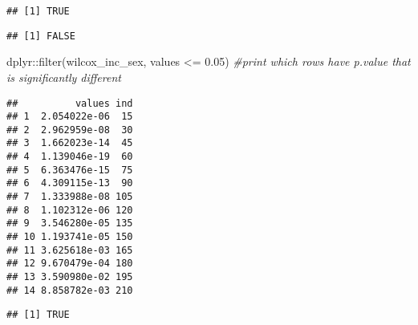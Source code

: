 \documentclass[
]{article}
\newenvironment{Shaded}{\begin{snugshade}}{\end{snugshade}}
\newcommand{\CommentTok}[1]{\textcolor[rgb]{0.56,0.35,0.01}{\textit{#1}}}
\newcommand{\FloatTok}[1]{\textcolor[rgb]{0.00,0.00,0.81}{#1}}
\newcommand{\FunctionTok}[1]{\textcolor[rgb]{0.00,0.00,0.00}{#1}}
\newcommand{\NormalTok}[1]{#1}
\newcommand{\OtherTok}[1]{\textcolor[rgb]{0.56,0.35,0.01}{#1}}
\newcommand{\SpecialCharTok}[1]{\textcolor[rgb]{0.00,0.00,0.00}{#1}}
\begin{document}
\begin{verbatim}
## [1] TRUE
\end{verbatim}

\begin{Shaded}
\end{Shaded}

\begin{verbatim}
## [1] FALSE
\end{verbatim}

\begin{Shaded}
\begin{Highlighting}[]
\NormalTok{dplyr}\SpecialCharTok{::}\FunctionTok{filter}\NormalTok{(wilcox\_inc\_sex, values }\SpecialCharTok{\textless{}=} \FloatTok{0.05}\NormalTok{) }\CommentTok{\#print which rows have p.value that is significantly different}
\end{Highlighting}
\end{Shaded}

\begin{verbatim}
##          values ind
## 1  2.054022e-06  15
## 2  2.962959e-08  30
## 3  1.662023e-14  45
## 4  1.139046e-19  60
## 5  6.363476e-15  75
## 6  4.309115e-13  90
## 7  1.333988e-08 105
## 8  1.102312e-06 120
## 9  3.546280e-05 135
## 10 1.193741e-05 150
## 11 3.625618e-03 165
## 12 9.670479e-04 180
## 13 3.590980e-02 195
## 14 8.858782e-03 210
\end{verbatim}

\begin{Shaded}
\end{Shaded}

\begin{verbatim}
## [1] TRUE
\end{verbatim}
\end{document}
